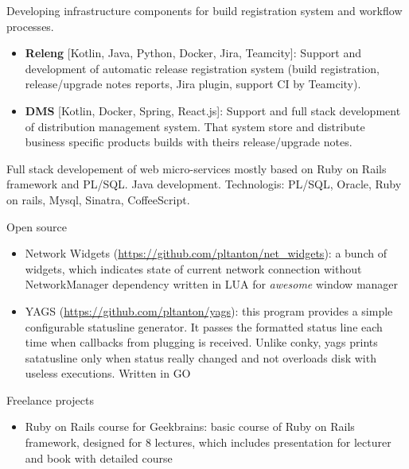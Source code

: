 \documentclass{cv}
\begin{document}
\begin{cvblock}{%
		}

	Developing infrastructure components for build registration
	system and workflow processes.

	\begin{itemize}
		\item \textbf{Releng} [Kotlin, Java, Python, Docker, Jira, Teamcity]: Support and development of automatic release registration system
		      (build registration, release/upgrade notes reports, Jira plugin,
		      support CI by Teamcity).
		\item \textbf{DMS} [Kotlin, Docker, Spring, React.js]: Support and full stack development of distribution management system. That system store and distribute
		      business specific products builds with theirs release/upgrade notes.
	\end{itemize}
\end{cvblock}

\begin{cvblock}{%
		}

	Full stack developement of web micro-services mostly based on Ruby on Rails framework and PL/SQL\@.
	Java development. Technologis: PL/SQL, Oracle, Ruby on rails, Mysql, Sinatra, CoffeeScript.
\end{cvblock}

\begin{cvblock}{Open source}
	\begin{itemize}
		\item Network Widgets
		      (\url{https://github.com/pltanton/net_widgets}):
		      a bunch of widgets, which indicates state of current network connection
		      without NetworkManager dependency written in LUA for
		      \textit{awesome} window manager
		\item YAGS
		      (\url{https://github.com/pltanton/yags}):
		      this program provides a simple configurable statusline generator. It
		      passes the formatted status line each time when callbacks from plugging
		      is received. Unlike conky, yags prints satatusline only when status
		      really changed and not overloads disk with useless executions. Written in
		      GO

	\end{itemize}
\end{cvblock}

\begin{cvblock}{Freelance projects}
	\begin{itemize}
		\item Ruby on Rails course for Geekbrains:
		      basic course of Ruby on Rails framework, designed for 8 lectures, which
		      includes presentation for lecturer and book with detailed course
	\end{itemize}
\end{cvblock}
\end{document}
